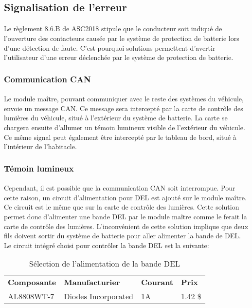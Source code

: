 
\subsection{Signalisation de l'erreur}

	\paragraph*{}
	Le règlement 8.6.B de ASC2018\cite{ASC2018} stipule que le conducteur soit indiqué de l'ouverture des contacteurs causée par le système de protection de batterie lors d'une détection de faute. C'est pourquoi solutions permettent d'avertir l'utilisateur d'une erreur déclenchée par le système de protection de batterie. 
	
	\subsubsection*{Communication CAN}
		\paragraph*{}
		Le module maître, pouvant communiquer avec le reste des systèmes du véhicule, envoie un message CAN. Ce message sera intercepté par la carte de contrôle des lumières du véhicule, situé à l'extérieur du système de batterie. La carte se chargera ensuite d'allumer un témoin lumineux visible de l'extérieur du véhicule. Ce même signal peut également être intercepté par le tableau de bord, situé à l'intérieur de l'habitacle.
		
	\subsubsection*{Témoin lumineux}
		\paragraph*{}
		Cependant, il est possible que la communication CAN soit interrompue. Pour cette raison, un circuit d'alimentation pour DEL est ajouté sur le module maître. Ce circuit est le même que sur la carte de contrôle des lumières. Cette solution permet donc d'alimenter une bande DEL par le module maître comme le ferait la carte de contrôle des lumières. L'inconvénient de cette solution implique que deux fils doivent sortir du système de batterie pour aller alimenter la bande de DEL. Le circuit intégré choisi pour contrôler la bande DEL est la suivante:
	
	\begin{table}[H]
		\centering
		\caption{Sélection de l'alimentation de la bande DEL}
		\label{LedDriver}
		\renewcommand{\arraystretch}{1.3}
		\begin{tabular}{|p{3cm}|p{4cm}|p{2cm}|p{1.5cm}|}
			\hline
			\textbf{Composante} & \textbf{Manufacturier} & \textbf{Courant} & \textbf{Prix}
			\\ \hhline{|=|=|=|=|}
			AL8808WT-7 & Diodes Incorporated  & 1A & 1.42 \$ \\ \hline		
		\end{tabular}
	\end{table}		

